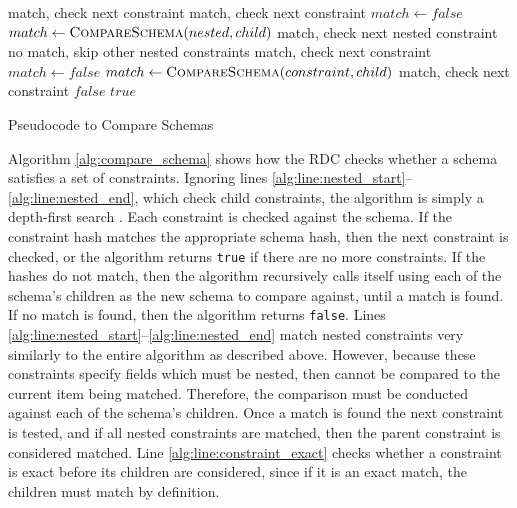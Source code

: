 \documentclass[12pt,twoside,notitlepage]{report}
\begin{document}
\begin{algorithm}
\begin{algorithmic}[1]
			 \label{alg:line:constraint_exact}
				\Continue \Comment match, check next constraint
				\Continue \Comment match, check next constraint
			\Else \label{alg:line:nested_start}
					\State $match\gets false$
						\State $match\gets \Call{CompareSchema}{nested, child}$
							\Continue \Comment match, check next nested constraint
						\EndIf
					\EndFor
						\Break \Comment no match, skip other nested constraints
					\EndIf
				\EndFor
					\Continue \Comment match, check next constraint
				\EndIf
			\EndIf \label{alg:line:nested_end}
		\Else
			\State $match\gets false$
				\State $match\gets \Call{CompareSchema}{constraint, child}$
					\Continue \Comment match, check next constraint
				\EndIf
			\EndFor
				\State \Return $false$
			\EndIf
		\EndIf
	\EndFor
	\State \Return $true$
\EndFunction 
\end{algorithmic}
\caption{Pseudocode to Compare Schemas}
\label{alg:compare_schema}
\end{algorithm}

Algorithm \ref{alg:compare_schema} shows how the RDC checks whether a schema satisfies a set of constraints. 
Ignoring lines \ref{alg:line:nested_start}--\ref{alg:line:nested_end}, which check child constraints, the algorithm is simply a depth-first search \cite{tarjan1972depth}. 
Each constraint is checked against the schema. 
If the constraint hash matches the appropriate schema hash, then the next constraint is checked, or the algorithm returns {\tt true} if there are no more constraints. 
If the hashes do not match, then the algorithm recursively calls itself using each of the schema's children as the new schema to compare against, until a match is found. 
If no match is found, then the algorithm returns {\tt false}. 
Lines \ref{alg:line:nested_start}--\ref{alg:line:nested_end} match nested constraints very similarly to the entire algorithm as described above. 
However, because these constraints specify fields which must be nested, then cannot be compared to the current item being matched. 
Therefore, the comparison must be conducted against each of the schema's children. 
Once a match is found the next constraint is tested, and if all nested constraints are matched, then the parent constraint is considered matched. 
Line \ref{alg:line:constraint_exact} checks whether a constraint is exact before its children are considered, since if it is an exact match, the children must match by definition. 
\end{document}
